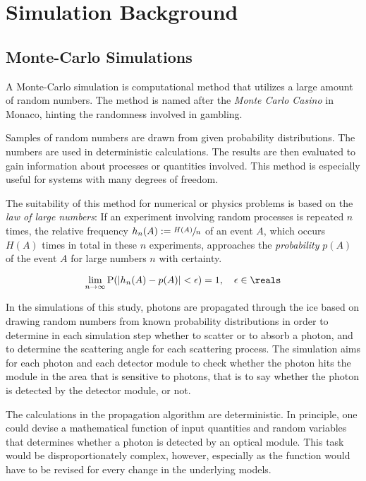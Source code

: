 
\section{Simulation Background}
\label{sec:simulation_background}

\subsection{Monte-Carlo Simulations}
\label{sec:monte_carlo}


A Monte-Carlo simulation is computational method that utilizes a large amount of random numbers. The method is named after the \textit{Monte Carlo Casino} in Monaco, hinting the randomness involved in gambling. \cite{physiklexikon}

Samples of random numbers are drawn from given probability distributions. The numbers are used in deterministic calculations. The results are then evaluated to gain information about processes or quantities involved. This method is especially useful for systems with many degrees of freedom. \cite{physiklexikon}

The suitability of this method for numerical or physics problems is based on the \textit{law of large numbers}: If an experiment involving random processes is repeated $n$ times, the relative frequency $h_n(A):=\sfrac{H(A)}{n}$ of an event $A$, which occurs $H(A)$ times in total in these $n$ experiments, approaches the \textit{probability} $p(A)$ of the event $A$ for large numbers $n$ with certainty. \cite{physiklexikon}

$$
  \lim_{n \rightarrow \infty} \text{P}(|h_n(A) - p(A)| < \epsilon) = 1, \ \ \ \epsilon \in \reals
$$

In the simulations of this study, photons are propagated through the ice based on drawing random numbers from known probability distributions in order to determine in each simulation step whether to scatter or to absorb a photon, and to determine the scattering angle for each scattering process. The simulation aims for each photon and each detector module to check whether the photon hits the module in the area that is sensitive to photons, that is to say whether the photon is detected by the detector module, or not.

The calculations in the propagation algorithm are deterministic. In principle, one could devise a mathematical function of input quantities and random variables that determines whether a photon is detected by an optical module. This task would be disproportionately complex, however, especially as the function would have to be revised for every change in the underlying models.

